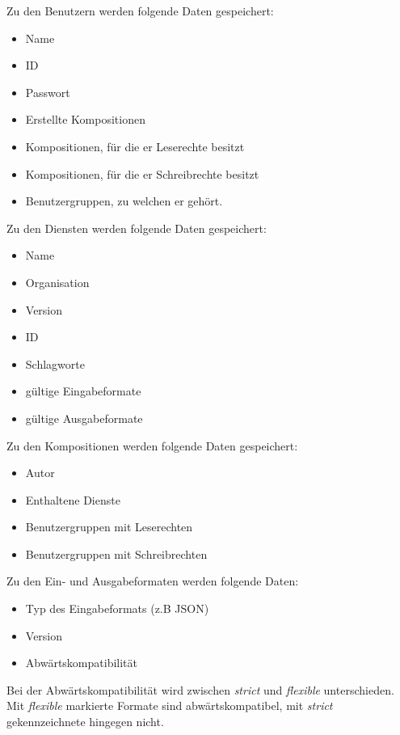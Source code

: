 Zu den Benutzern werden folgende Daten gespeichert:
\begin{itemize}
	\item Name
	\item ID
	\item Passwort
	\item Erstellte Kompositionen
	\item Kompositionen, für die er Leserechte besitzt
	\item Kompositionen, für die er Schreibrechte besitzt
	\item Benutzergruppen, zu welchen er gehört.
\end{itemize}
Zu den Diensten werden folgende Daten gespeichert:
\begin{itemize}
	\item Name
	\item Organisation
	\item Version
	\item ID
	\item Schlagworte
	\item gültige Eingabeformate
	\item gültige Ausgabeformate
\end{itemize}
Zu den Kompositionen werden folgende Daten gespeichert:
\begin{itemize}
	\item Autor
	\item Enthaltene Dienste
	\item Benutzergruppen mit Leserechten
	\item Benutzergruppen mit Schreibrechten
\end{itemize}

Zu den Ein- und Ausgabeformaten werden folgende Daten:
\begin{itemize}
	\item Typ des Eingabeformats (z.B JSON)
	\item Version
	\item Abwärtskompatibilität\\
\end{itemize}
Bei der Abwärtskompatibilität wird zwischen \textit{strict} und \textit{flexible} unterschieden. Mit \textit{flexible} markierte Formate sind abwärtskompatibel, mit \textit{strict} gekennzeichnete hingegen nicht.

